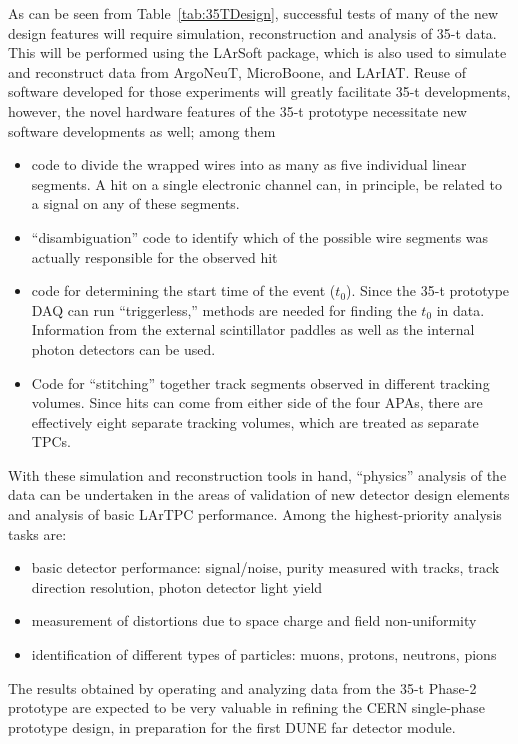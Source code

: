 As can be seen from Table~\ref{tab:35TDesign}, successful tests of many of the new
design features will require simulation, reconstruction and analysis of 35-t data.
This will be performed using the LArSoft package, which is also used to simulate and
reconstruct data from ArgoNeuT, MicroBoone, and LArIAT.
Reuse of software developed for those experiments will greatly facilitate 35-t developments,
however, the novel hardware features of the 35-t prototype necessitate new software developments
as well; among them
\begin{itemize}
\item{code to divide the wrapped wires into as many as five individual linear segments.
A hit on a single electronic channel can, in principle, be related to a
signal on any of these segments.}
\item{``disambiguation'' code to identify which of the possible wire segments was actually responsible
for the observed hit}
\item{code for determining the start time of the event ($t_0$). Since the 35-t prototype DAQ can
run ``triggerless,'' methods are needed for finding the $t_0$ in data. Information from the external
scintillator paddles as well as the internal photon detectors can be used.}
\item{Code for ``stitching'' together track segments observed in different tracking volumes.
Since hits can come from either side of the four APAs, there are
effectively eight separate tracking volumes,
which are treated as separate TPCs.}
\end{itemize}

With these simulation and reconstruction tools in hand, ``physics'' analysis of the data can be undertaken
in the areas of %
validation of new detector design elements and analysis of basic LArTPC performance. %
Among the highest-priority analysis tasks are:

\begin{itemize}
\item{basic detector performance: signal/noise, purity measured with tracks, track direction resolution,
photon detector light yield}
\item{measurement of distortions due to space charge and field non-uniformity}
\item{identification of different types of particles: muons, protons, neutrons, pions}
\end{itemize}

The results obtained by operating and analyzing data from the 35-t Phase-2 prototype are expected
to be very valuable in refining the CERN single-phase prototype design, in preparation for the first  DUNE far detector module.
